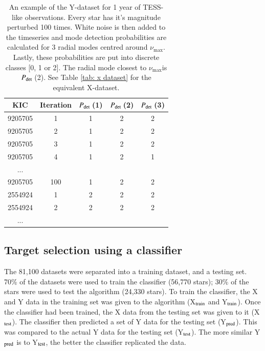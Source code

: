 \documentclass[a4paper,fleqn,usenatbib,useAMS]{mnras}
\newcommand{\numax}{\ensuremath{\nu_{\textrm{max}}}}
\newcommand{\pdet}{\ensuremath{P_{\rm det}\:}}
\begin{document}
\begin{table}
\begin{center}
\begin{tabular}{|*{5}{c|}}
KIC & Iteration & \pdet(1) & \pdet(2) & \pdet(3) \\
\hline
9205705	& 1     & 1 & 2 & 2 \\
9205705	& 2     & 1 & 2 & 2 \\
9205705	& 3     & 1 & 2 & 2 \\
9205705	& 4     & 1 & 2 & 1 \\
...                         \\
9205705	& 100   & 1 & 2 & 2 \\
2554924	& 1	    & 2 & 2 & 2 \\
2554924	& 2     & 2 & 2 & 2 \\
...                         \\
\hline
\end{tabular}
\end{center}
\caption{An example of the Y-dataset for 1 year of TESS-like observations. Every star has it's magnitude perturbed 100 times. White noise is then added to the timeseries and mode detection probabilities are calculated for 3 radial modes centred around \numax. Lastly, these probabilities are put into discrete classes [0, 1 or 2]. The radial mode closest to \numax is \pdet(2). See Table \ref{tab: x dataset} for the equivalent X-dataset.}
\label{tab: y dataset}
\end{table}



\subsection{Target selection using a classifier}
\label{sect: class-results}

The 81,100 datasets were separated into a training dataset, and a testing set. 70\% of the datasets were used to train the classifier (56,770 stars); 30\% of the stars were used to test the algorithm (24,330 stars). To train the classifier, the X and Y data in the training set was given to the algorithm (X$_{\rm train}$ and Y$_{\rm train}$). Once the classifier had been trained, the X data from the testing set was given to it (X$_{\rm test}$). The classifier then predicted a set of Y data for the testing set (Y$_{\rm pred}$). This was compared to the actual Y data for the testing set (Y$_{\rm test}$). The more similar Y$_{\rm pred}$ is to Y$_{\rm test}$, the better the classifier replicated the data.
\end{document}
